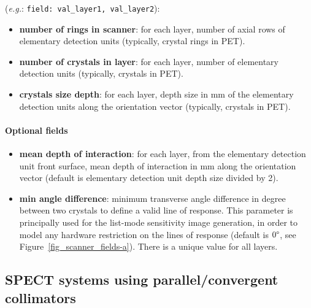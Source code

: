 \documentclass[a4paper, 11pt]{article}
\begin{document}
({\it e.g.}: \texttt{field: val\_layer1, val\_layer2}):
\begin{itemize}
  \item \textbf{number of rings in scanner}: for each layer, number of axial rows of elementary detection units (typically, crystal rings in PET).
  \item \textbf{number of crystals in layer}: for each layer, number of elementary detection units (typically, crystals in PET).
  \item \textbf{crystals size depth}: for each layer, depth size in mm of the elementary detection units along the orientation vector (typically,
        crystals in PET).
\end{itemize}

\paragraph{Optional fields}
\begin{itemize}
  \item \textbf{mean depth of interaction}: for each layer, from the elementary detection unit front surface, mean depth of interaction in mm along
        the orientation vector  (default is elementary detection unit depth size divided by 2).
  \item \textbf{min angle difference}: minimum transverse angle difference in degree between two crystals to define a valid line of response.
        This parameter is principally used for the list-mode sensitivity image generation, in order to model any hardware restriction on the lines
        of response (default is $0\degree$,  see Figure~\ref{fig_scanner_fields-a}). There is a unique value for all layers. 
        
\end{itemize}

\newpage
\subsection{SPECT systems using parallel/convergent collimators}
\label{ss_scanner_integration_SPECT_conv}
\end{document}
